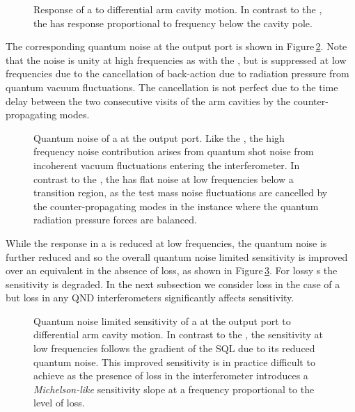 \begin{figure}
  \centering
  
  \caption[Response of a \SSM{} to differential arm cavity motion]{\label{fig:ssm-response}Response of a \SSM{} to differential arm cavity motion. In contrast to the \MI{}, the \SSM{} has response proportional to frequency below the cavity pole.}
\end{figure}

The corresponding quantum noise at the output port is shown in Figure\,\ref{fig:ssm-noise}. Note that the noise is unity at high frequencies as with the \FPMI{}, but is suppressed at low frequencies due to the cancellation of back-action due to radiation pressure from quantum vacuum fluctuations. The cancellation is not perfect due to the time delay between the two consecutive visits of the arm cavities by the counter-propagating modes.

\begin{figure}
  \centering
  
  \caption[Quantum noise of a \SSM{} at the output port]{\label{fig:ssm-noise}Quantum noise of a \SSM{} at the output port. Like the \MI{}, the high frequency noise contribution arises from quantum shot noise from incoherent vacuum fluctuations entering the interferometer. In contrast to the \MI{}, the \SSM{} has flat noise at low frequencies below a transition region, as the test mass noise fluctuations are cancelled by the counter-propagating modes in the instance where the quantum radiation pressure forces are balanced.}
\end{figure}

While the response in a \SSM{} is reduced at low frequencies, the quantum noise is further reduced and so the overall quantum noise limited sensitivity is improved over an equivalent \FPMI{} in the absence of loss, as shown in Figure\,\ref{fig:ssm-sensitivity}. For lossy \SM{}s the sensitivity is degraded. In the next subsection we consider loss in the case of a \SSM{} but loss in any \gls{QND} interferometers significantly affects sensitivity.

\begin{figure}
  \centering
  
  \caption[Sensitivity of a \SSM{} at the output port to differential arm cavity motion]{\label{fig:ssm-sensitivity}Quantum noise limited sensitivity of a \SSM{} at the output port to differential arm cavity motion. In contrast to the \MI{}, the \SSM{} sensitivity at low frequencies follows the gradient of the \gls{SQL} due to its reduced quantum noise. This improved sensitivity is in practice difficult to achieve as the presence of loss in the interferometer introduces a \emph{Michelson-like} sensitivity slope at a frequency proportional to the level of loss.}
\end{figure}

